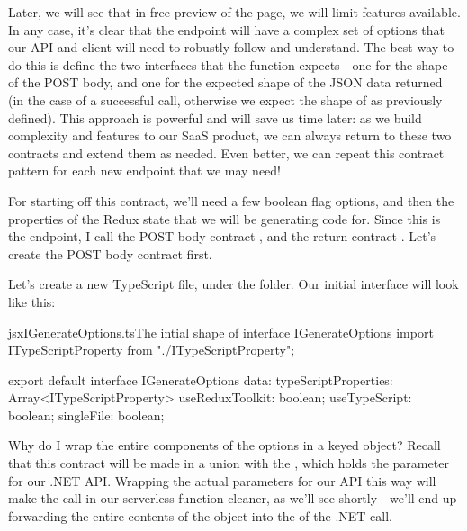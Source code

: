 \documentclass[paper=6in:9in,pagesize=pdftex,headinclude=on,footinclude=on,12pt,twoside]{scrbook}
\begin{document}
Later, we will see that in free preview of the  page, we will limit features available. In any case, it's clear that the  endpoint will have a complex set of options that our API and client will need to robustly follow and understand. The best way to do this is define the two interfaces that the  function expects - one for the shape of the POST body, and one for the expected shape of the JSON data returned (in the case of a successful call, otherwise we expect the shape of  as previously defined). This approach is powerful and will save us time later: as we build complexity and features to our SaaS product, we can always return to these two contracts and extend them as needed. Even better, we can repeat this contract pattern for each new endpoint that we may need!

For starting off this contract, we'll need a few boolean flag options, and then the properties of the Redux state that we will be generating code for. Since this is the  endpoint, I call the POST body contract , and the return contract . Let's create the POST body contract first.


Let's create a new TypeScript file,  under the  folder. Our initial  interface will look like this:

\begin{codeInput}{jsx}{IGenerateOptions.ts}{The intial shape of interface IGenerateOptions}
import ITypeScriptProperty from "./ITypeScriptProperty";

export default interface IGenerateOptions {
  data: {
    typeScriptProperties: Array<ITypeScriptProperty>
    useReduxToolkit: boolean;
    useTypeScript: boolean;
    singleFile: boolean;
  }
}
\end{codeInput}

Why do I wrap the entire components of the options in a keyed  object? Recall that this contract will be made in a union with the , which holds the  parameter for our .NET API. Wrapping the actual parameters for our API this way will make the call in our serverless function cleaner, as we'll see shortly - we'll end up forwarding the entire contents of the  object into the  of the .NET call.
\end{document}
